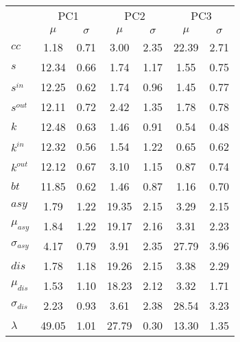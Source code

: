 \begin{center}
\begin{tabular}{| l | c | c | c | c | c | c |}\cline{2-7}
\multicolumn{1}{c|}{} & \multicolumn{2}{c|}{PC1}          & \multicolumn{2}{c|}{PC2} & \multicolumn{2}{c|}{PC3}  \\\cline{2-7}\multicolumn{1}{c|}{} & $\mu$            & $\sigma$ & $\mu$         & $\sigma$ & $\mu$ & $\sigma$  \\\hline
$cc$ & 1.18  & 0.71  & 3.00  & 2.35  & 22.39  & 2.71 \\\hline
$s$ & 12.34  & 0.66  & 1.74  & 1.17  & 1.55  & 0.75 \\
$s^{in}$ & 12.25  & 0.62  & 1.74  & 0.96  & 1.45  & 0.77 \\
$s^{out}$ & 12.11  & 0.72  & 2.42  & 1.35  & 1.78  & 0.78 \\
$k$ & 12.48  & 0.63  & 1.46  & 0.91  & 0.54  & 0.48 \\
$k^{in}$ & 12.32  & 0.56  & 1.54  & 1.22  & 0.65  & 0.62 \\
$k^{out}$ & 12.12  & 0.67  & 3.10  & 1.15  & 0.87  & 0.74 \\
$bt$ & 11.85  & 0.62  & 1.46  & 0.87  & 1.16  & 0.70 \\\hline
$asy$ & 1.79  & 1.22  & 19.35  & 2.15  & 3.29  & 2.15 \\
$\mu_{asy}$ & 1.84  & 1.22  & 19.17  & 2.16  & 3.31  & 2.23 \\
$\sigma_{asy}$ & 4.17  & 0.79  & 3.91  & 2.35  & 27.79  & 3.96 \\
$dis$ & 1.78  & 1.18  & 19.26  & 2.15  & 3.38  & 2.29 \\
$\mu_{dis}$ & 1.53  & 1.10  & 18.23  & 2.12  & 3.32  & 1.71 \\
$\sigma_{dis}$ & 2.23  & 0.93  & 3.61  & 2.38  & 28.54  & 3.23 \\\hline\hline
$\lambda$ & 49.05  & 1.01  & 27.79  & 0.30  & 13.30  & 1.35 \\
\hline\end{tabular}
\end{center}
